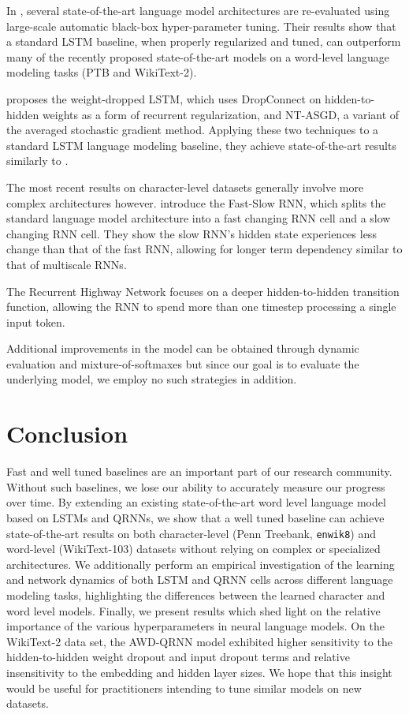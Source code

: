 \documentclass{article}
\newcommand{\enwik}{\texttt{enwik8}\xspace}
\begin{document}
In \citet{Melis2017}, several state-of-the-art language model architectures are re-evaluated using large-scale automatic black-box hyper-parameter tuning.
Their results show that a standard LSTM baseline, when properly regularized and tuned, can outperform many of the recently proposed state-of-the-art models on a word-level language modeling tasks (PTB and WikiText-2).

\citet{Merity2016} proposes the weight-dropped LSTM, which uses DropConnect on hidden-to-hidden weights as a form of recurrent regularization, and NT-ASGD, a variant of the averaged stochastic gradient method.
Applying these two techniques to a standard LSTM language modeling baseline, they achieve state-of-the-art results similarly to \citet{Melis2017}.

The most recent results on character-level datasets generally involve more complex architectures however.
\citet{fastslowlm} introduce the Fast-Slow RNN, which splits the standard language model architecture into a fast changing RNN cell and a slow changing RNN cell.
They show the slow RNN's hidden state experiences less change than that of the fast RNN, allowing for longer term dependency similar to that of multiscale RNNs.

The Recurrent Highway Network \citep{Zilly2016} focuses on a deeper hidden-to-hidden transition function, allowing the RNN to spend more than one timestep processing a single input token.

Additional improvements in the model can be obtained through dynamic evaluation \cite{dynamiceval} and mixture-of-softmaxes \cite{softmaxmixture} but since our goal is to evaluate the underlying model, we employ no such strategies in addition.

\section{Conclusion}

Fast and well tuned baselines are an important part of our research community.
Without such baselines, we lose our ability to accurately measure our progress over time.
By extending an existing state-of-the-art word level language model based on LSTMs and QRNNs, we show that a well tuned baseline can achieve state-of-the-art results on both character-level (Penn Treebank, \enwik) and word-level (WikiText-103) datasets without relying on complex or specialized architectures.
We additionally perform an empirical investigation of the learning and network dynamics of both LSTM and QRNN cells across different language modeling tasks, highlighting the differences between the learned character and word level models. Finally, we present results which shed light on the relative importance of the various hyperparameters in neural language models. On the WikiText-2 data set, the AWD-QRNN model exhibited higher sensitivity to the hidden-to-hidden weight dropout and input dropout terms and relative insensitivity to the embedding and hidden layer sizes. We hope that this insight would be useful for practitioners intending to tune similar models on new datasets. 

\newpage


\end{document}

